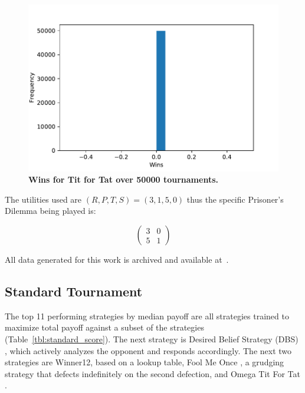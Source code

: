 \documentclass[10pt,letterpaper]{article}
\begin{document}
\begin{figure}[!hbtp]
        \centering
        \includegraphics[width=.5\textwidth]{standard_tft_wins.pdf}
        \caption{\bf Wins for Tit for Tat over
        50000 tournaments.}
        \label{fig:tit_for_tat_wins}
\end{figure}


The utilities used are \((R, P, T, S)=(3, 1, 5, 0)\) thus the specific
Prisoner's Dilemma being played is:

\begin{equation}\label{equ:pd}
    \begin{pmatrix}
        3 & 0\\
        5 & 1
    \end{pmatrix}
\end{equation}

All data generated for this work is archived and available at~\cite{data}.

\subsection*{Standard Tournament}\label{sec:standard}

The top 11 performing strategies by median payoff are all strategies trained to maximize
total payoff against a subset of the strategies (Table~\ref{tbl:standard_score}).
The next strategy is Desired Belief Strategy (DBS) \cite{Au2006},
which actively analyzes the opponent and responds
accordingly. The next two strategies are Winner12, based on a lookup table,
Fool Me Once \cite{axelrodproject}, a grudging strategy that defects indefinitely on
the second defection, and Omega Tit For Tat \cite{kendall2007iterated}.
\end{document}
